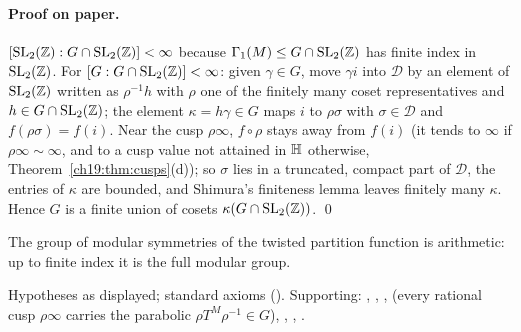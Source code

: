 \paragraph{Proof on paper.}  $[\mathrm{SL}_2(\mathbb{Z}):G\cap\mathrm{SL}_2(\mathbb{Z})]<\infty$ because $\Gamma_1(M)\le G\cap\mathrm{SL}_2(\mathbb{Z})$ has finite index in $\mathrm{SL}_2(\mathbb{Z})$.  For
$[G:G\cap\mathrm{SL}_2(\mathbb{Z})]<\infty$: given $\gamma\in G$, move $\gamma i$ into $\mathcal D$ by an element of $\mathrm{SL}_2(\mathbb{Z})$ written as $\rho^{-1}h$ with $\rho$ one of the
finitely many coset representatives and $h\in G\cap\mathrm{SL}_2(\mathbb{Z})$; the element $\kappa=h\gamma\in G$ maps $i$ to $\rho\sigma$ with $\sigma\in\mathcal D$ and
$f(\rho\sigma)=f(i)$.  Near the cusp $\rho\infty$, $f\circ\rho$ stays away from $f(i)$ (it tends to $\infty$ if $\rho\infty\sim\infty$, and to a cusp value not
attained in $\mathbb{H}$ otherwise, Theorem~\ref{ch19:thm:cusps}(d)); so $\sigma$ lies in a truncated, compact part of $\mathcal D$, the entries of $\kappa$ are
bounded, and Shimura's finiteness lemma leaves finitely many $\kappa$.  Hence $G$ is a finite union of cosets $\kappa(G\cap\mathrm{SL}_2(\mathbb{Z}))$. \qed
\begin{physics}The group of modular symmetries of the twisted partition function is arithmetic: up to finite index it is the full modular
group.\end{physics}
\begin{status}Hypotheses as displayed; standard axioms ().  Supporting:
, , , 
(every rational cusp $\rho\infty$ carries the parabolic $\rho T^M\rho^{-1}\in G$), , ,
.\end{status}

